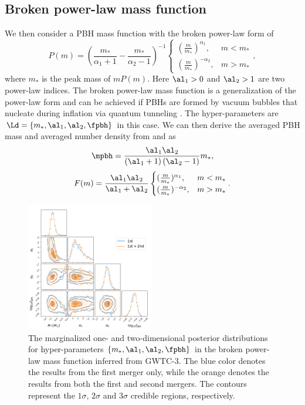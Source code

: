 \documentclass[twocolumn]{aastex631}
\def\({\left(}
\def\){\right)}
\def\e{\begin{equation}}
\def\q{\end{equation}}
\begin{document}
\subsection{Broken power-law mass function}
We then consider a PBH mass function with the broken power-law form \citep{Deng:2021ezy} of
\begin{equation}
	P(m)= \left(\frac{m_*}{\alpha_1+1}-\frac{m_*}{\alpha_2-1}\right)^{-1} \begin{cases} (\frac{m}{m_*})^{\alpha_1}, & m<m_* \\ (\frac{m}{m_*})^{-\alpha_2}, & m>m_*\end{cases},
\end{equation}
where $m_*$ is the peak mass of $m P(m)$. Here $\al_1>0$ and $\al_2>1$ are two power-law indices. The broken power-law mass function is a generalization of the power-law form and can be achieved if PBHs are formed by vacuum bubbles that nucleate during inflation via quantum tunneling \citep{Deng:2021ezy}.
The hyper-parameters are $\Ld = \{m_*, \al_1, \al_2, \fpbh\}$ in this case. 
We can then derive the averaged PBH mass and averaged number density from  and  as
\e
\mpbh = \frac{\al_1 \al_2}{\(\al_1 +1\)\(\al_2 -1\)} m_*,
\q
\e 
F(m) = \frac{\al_1 \al_2}{\al_1 + \al_2} \begin{cases} (\frac{m}{m_*})^{\alpha_1}, & m<m_* \\ (\frac{m}{m_*})^{-\alpha_2}, & m>m_*\end{cases}.
\q

\begin{figure}[tbp!]
	\centering
	\includegraphics[width=0.5\textwidth]{post-bpower.pdf}
	\caption{\label{posterior-bpower}The marginalized one- and two-dimensional posterior distributions for hyper-parameters $\{m_*, \al_1, \al_2, \fpbh\}$ in the broken power-law mass function inferred from GWTC-3. The blue color denotes the results from the first merger only, while the orange denotes the results from both the first and second mergers. The contours represent the $1\sigma$, $2\sigma$ and $3\sigma$ credible regions, respectively.}
\end{figure}
\end{document}
